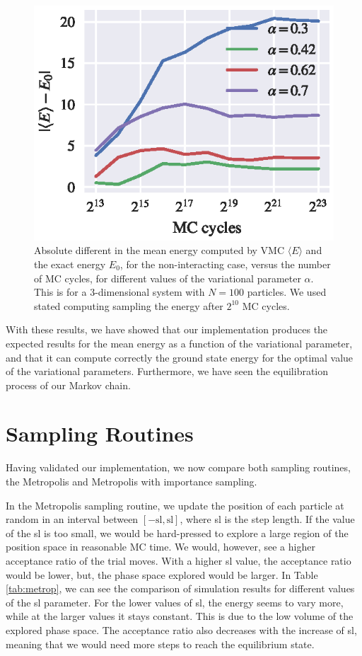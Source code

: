 \documentclass[aps,reprint,superscriptaddress,nofootinbib]{revtex4-2}
\begin{document}
    \begin{figure}
        \centering
        \includegraphics{figures/part_b/E_vs_mc_cycles.eps}
        \caption{Absolute different in the mean energy computed by VMC \(\langle E \rangle\) and the exact energy \(E_0\), for the non-interacting case, versus the number of MC cycles, for different values of the variational parameter \(\alpha\). This is for a 3-dimensional system with \(N=100\) particles. We used stated computing sampling the energy after \(2^{10}\) MC cycles.}
        \label{fig:mean_E_vs_mc_cycles}
    \end{figure}
    
    With these results, we have showed that our implementation produces the expected results for the mean energy as a function of the variational parameter, and that it can compute correctly the ground state energy for the optimal value of the variational parameters. Furthermore, we have seen the equilibration process of our Markov chain.
    
\section*{Sampling Routines}

    Having validated our implementation, we now compare both sampling routines, the Metropolis and Metropolis with importance sampling.

    In the Metropolis sampling routine, we update the position of each particle at random in an interval between \([-\text{sl}, \text{sl}]\), where sl is the step length. If the value of the sl is too small, we would be hard-pressed to explore a large region of the position space in reasonable MC time. We would, however, see a higher acceptance ratio of the trial moves. With a higher sl value, the acceptance ratio would be lower, but, the phase space explored would be larger. In Table \ref{tab:metrop}, we can see the comparison of simulation results for different values of the sl parameter. For the lower values of sl, the energy seems to vary more, while at the larger values it stays constant. This is due to the low volume of the explored phase space. The acceptance ratio also decreases with the increase of sl, meaning that we would need more steps to reach the equilibrium state.
\end{document}
